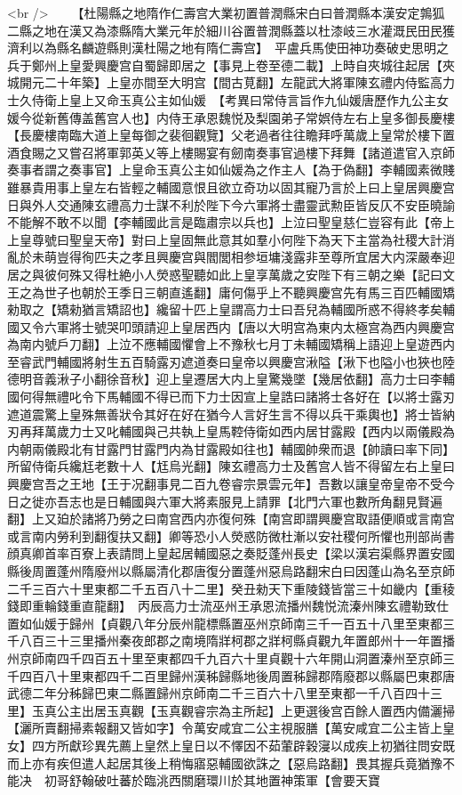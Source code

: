<br />
　　【杜陽縣之地隋作仁壽宫大業初置普潤縣宋白曰普潤縣本漢安定鶉狐二縣之地在漢又為漆縣隋大業元年於細川谷置普潤縣蓋以杜漆岐三水灌溉民田民獲濟利以為縣名麟遊縣則漢杜陽之地有隋仁壽宫】　平盧兵馬使田神功奏破史思明之兵于鄭州上皇愛興慶宫自蜀歸即居之【事見上卷至德二載】上時自夾城往起居【夾城開元二十年築】上皇亦間至大明宫【間古莧翻】左龍武大將軍陳玄禮内侍監高力士久侍衛上皇上又命玉真公主如仙媛　【考異曰常侍言旨作九仙媛唐歷作九公主女媛今從新舊傳盖舊宫人也】内侍王承恩魏悦及梨園弟子常娯侍左右上皇多御長慶樓【長慶樓南臨大道上皇每御之裴徊觀覽】父老過者往往瞻拜呼萬歲上皇常於樓下置酒食賜之又嘗召將軍郭英乂等上樓賜宴有劒南奏事官過樓下拜舞【諸道遣官入京師奏事者謂之奏事官】上皇命玉真公主如仙媛為之作主人【為于偽翻】李輔國素微賤雖暴貴用事上皇左右皆輕之輔國意恨且欲立奇功以固其寵乃言於上曰上皇居興慶宫日與外人交通陳玄禮高力士謀不利於陛下今六軍將士盡靈武勲臣皆反仄不安臣曉諭不能解不敢不以聞【李輔國此言是臨肅宗以兵也】上泣曰聖皇慈仁豈容有此【帝上上皇尊號曰聖皇天帝】對曰上皇固無此意其如羣小何陛下為天下主當為社稷大計消亂於未萌豈得徇匹夫之孝且興慶宫與閻閭相参垣墉淺露非至尊所宜居大内深嚴奉迎居之與彼何殊又得杜絶小人熒惑聖聽如此上皇享萬歲之安陛下有三朝之樂【記曰文王之為世子也朝於王季日三朝直遙翻】庸何傷乎上不聽興慶宫先有馬三百匹輔國矯勑取之【矯勑猶言矯詔也】纔留十匹上皇謂高力士曰吾兒為輔國所惑不得終孝矣輔國又令六軍將士號哭叩頭請迎上皇居西内【唐以大明宫為東内太極宫為西内興慶宫為南内號戶刀翻】上泣不應輔國懼會上不豫秋七月丁未輔國矯稱上語迎上皇遊西内至睿武門輔國將射生五百騎露刃遮道奏曰皇帝以興慶宫湫隘【湫下也隘小也狹也陸德明音義湫子小翻徐音秋】迎上皇遷居大内上皇驚幾墜【幾居依翻】高力士曰李輔國何得無禮叱令下馬輔國不得已而下力士因宣上皇誥曰諸將士各好在【以將士露刃遮道震驚上皇殊無善狀令其好在好在猶今人言好生言不得以兵干乘輿也】將士皆納刃再拜萬歲力士又叱輔國與己共執上皇馬鞚侍衛如西内居甘露殿【西内以兩儀殿為内朝兩儀殿北有甘露門甘露門内為甘露殿如往也】輔國帥衆而退【帥讀曰率下同】所留侍衛兵纔尪老數十人【尪烏光翻】陳玄禮高力士及舊宫人皆不得留左右上皇曰興慶宫吾之王地【王于况翻事見二百九卷睿宗景雲元年】吾數以讓皇帝皇帝不受今日之徙亦吾志也是日輔國與六軍大將素服見上請罪【北門六軍也數所角翻見賢遍翻】上又廹於諸將乃勞之曰南宫西内亦復何殊【南宫即謂興慶宫取語便順或言南宫或言南内勞利到翻復扶又翻】卿等恐小人熒惑防微杜漸以安社稷何所懼也刑部尚書顔真卿首率百寮上表請問上皇起居輔國惡之奏貶蓬州長史【梁以漢宕渠縣界置安國縣後周置蓬州隋廢州以縣屬清化郡唐復分置蓬州惡烏路翻宋白曰因蓬山為名至京師二千三百六十里東都二千五百八十二里】癸丑勑天下重陵錢皆當三十如畿内【重稜錢即重輪錢重直龍翻】　丙辰高力士流巫州王承恩流播州魏悦流溱州陳玄禮勒致仕置如仙媛于歸州【貞觀八年分辰州龍標縣置巫州京師南三千一百五十八里至東都三千八百三十三里播州秦夜郎郡之南境隋牂柯郡之牂柯縣貞觀九年置郎州十一年置播州京師南四千四百五十里至東都四千九百六十里貞觀十六年開山洞置溱州至京師三千四百八十里東都四千二百里歸州漢秭歸縣地後周置秭歸郡隋廢郡以縣屬巴東郡唐武德二年分秭歸巴東二縣置歸州京師南二千三百六十八里至東都一千八百四十三里】玉真公主出居玉真觀【玉真觀睿宗為主所起】上更選後宫百餘人置西内備灑掃【灑所賣翻掃素報翻又皆如字】令萬安咸宜二公主視服膳【萬安咸宜二公主皆上皇女】四方所獻珍異先薦上皇然上皇日以不懌因不茹葷辟穀寖以成疾上初猶往問安既而上亦有疾但遣人起居其後上稍悔寤惡輔國欲誅之【惡烏路翻】畏其握兵竟猶豫不能决　初哥舒翰破吐蕃於臨洮西關磨環川於其地置神策軍【會要天寶